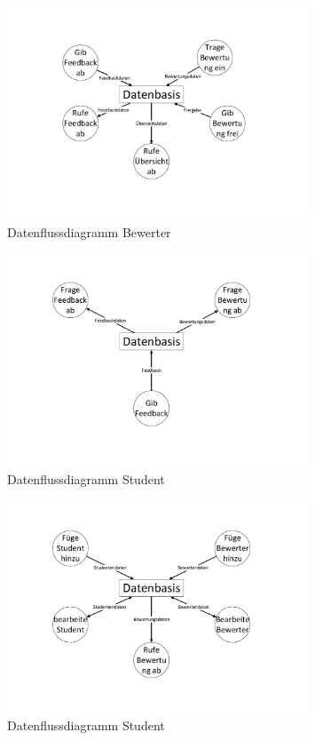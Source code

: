 \documentclass[a4paper,listof=leveldown,listof=numbered]{scrreprt}
\begin{document}
	\begin{figure}
		\centering
		\includegraphics[width=0.8\textwidth]{../Diagramme/Kontextdiagramm_DFD2_Bewerter.pdf}
		\caption{Datenflussdiagramm Bewerter}
	\end{figure}
	\begin{figure}
		\centering
		\includegraphics[width=0.8\textwidth]{../Diagramme/Kontextdiagramm_DFD2_Student.pdf}
		\caption{Datenflussdiagramm Student}
	\end{figure}
	\begin{figure}
		\centering
		\includegraphics[width=0.8\textwidth]{../Diagramme/Kontextdiagramm_DFD2_Verwalter.pdf}
		\caption{Datenflussdiagramm Student}
	\end{figure}
	
	
	
	\listoftables
		
\end{document}
